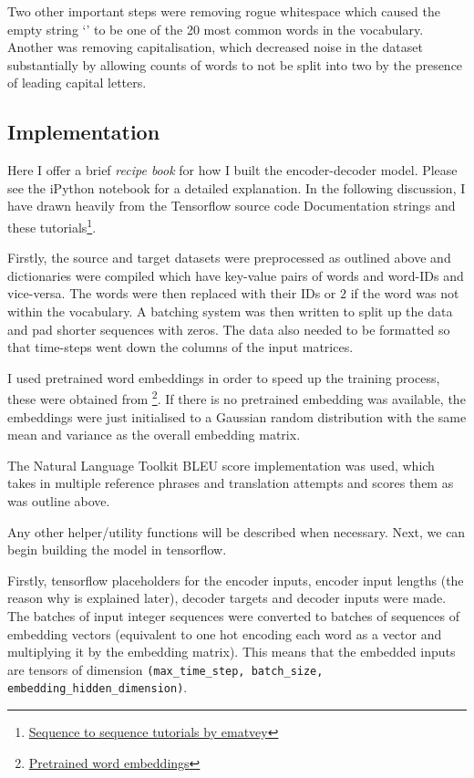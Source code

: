 \documentclass[]{article}
\begin{document}
Two other important steps were removing rogue whitespace which caused the empty string `' to be one of the 20 most common words in the vocabulary. Another was removing capitalisation, which decreased noise in the dataset substantially by allowing counts of words to not be split into two by the presence of leading capital letters.

\subsection{Implementation}
Here I offer a brief \textit{recipe book} for how I built the encoder-decoder model. Please see the iPython notebook for a detailed explanation. In the following discussion, I have drawn heavily from the Tensorflow source code Documentation strings and these tutorials\footnote{ \href{https://github.com/ematvey/tensorflow-seq2seq-tutorials}{Sequence to sequence tutorials by ematvey}}.

Firstly, the source and target datasets were preprocessed as outlined above and dictionaries were compiled which have key-value pairs of words and word-IDs and vice-versa. The words were then replaced with their IDs or $2$ if the word was not within the vocabulary. A batching system was then written to split up the data and pad shorter sequences with zeros. The data also needed to be formatted so that time-steps went down the columns of the input matrices.

I used pretrained word embeddings in order to speed up the training process, these were obtained from  \footnote{\href{https://sites.google.com/site/rmyeid/projects/polyglot\#TOC-Download-the-Embeddings}{Pretrained word embeddings}}. If there is no pretrained embedding was available, the embeddings were just initialised to a Gaussian random distribution with the same mean and variance as the overall embedding matrix.

The Natural Language Toolkit BLEU score implementation was used, which takes in multiple reference phrases and translation attempts and scores them as was outline above.
	
Any other helper/utility functions will be described when necessary. Next, we can begin building the model in tensorflow.

Firstly, tensorflow placeholders for the encoder inputs, encoder input lengths (the reason why is explained later), decoder targets and decoder inputs were made. The batches of input integer sequences were converted to batches of sequences of embedding vectors (equivalent to one hot encoding each word as a vector and multiplying it by the embedding matrix). This means that the embedded inputs are tensors of dimension \lstinline{(max_time_step, batch_size, embedding_hidden_dimension)}.
\end{document}
